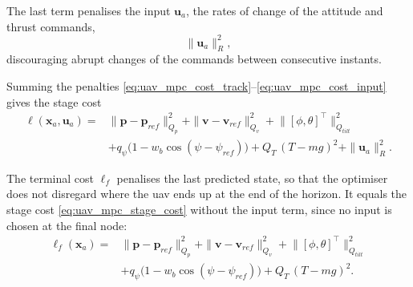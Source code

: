 The last term penalises the input $\mathbf{u}_a$, the rates of change of the attitude and thrust commands,
\begin{equation}
    \|\mathbf{u}_a\|^2_{R},
    \label{eq:uav_mpc_cost_input}
\end{equation}
discouraging abrupt changes of the commands between consecutive instants.

Summing the penalties \eqref{eq:uav_mpc_cost_track}--\eqref{eq:uav_mpc_cost_input} gives the stage cost
\begin{equation}
    \begin{aligned}
        \ell(\mathbf{x}_a,\mathbf{u}_a) = {} & \|\mathbf{p}-\mathbf{p}_{ref}\|^2_{Q_p} + \|\mathbf{v}-\mathbf{v}_{ref}\|^2_{Q_v} + \big\|[\phi,\theta]^\top\big\|^2_{Q_{tilt}} \\
        & + q_\psi\big(1 - w_b\cos(\psi-\psi_{ref})\big) + Q_T\,(T-mg)^2 + \|\mathbf{u}_a\|^2_R.
    \end{aligned}
    \label{eq:uav_mpc_stage_cost}
\end{equation}

The terminal cost $\ell_f$ penalises the last predicted state, so that the optimiser does not disregard where the \gls{uav} ends up at the end of the horizon. It equals the stage cost \eqref{eq:uav_mpc_stage_cost} without the input term, since no input is chosen at the final node:
\begin{equation}
    \begin{aligned}
        \ell_f(\mathbf{x}_a) = {} & \|\mathbf{p}-\mathbf{p}_{ref}\|^2_{Q_p} + \|\mathbf{v}-\mathbf{v}_{ref}\|^2_{Q_v} + \big\|[\phi,\theta]^\top\big\|^2_{Q_{tilt}} \\
        & + q_\psi\big(1 - w_b\cos(\psi-\psi_{ref})\big) + Q_T\,(T-mg)^2.
    \end{aligned}
    \label{eq:uav_mpc_terminal_cost}
\end{equation}

